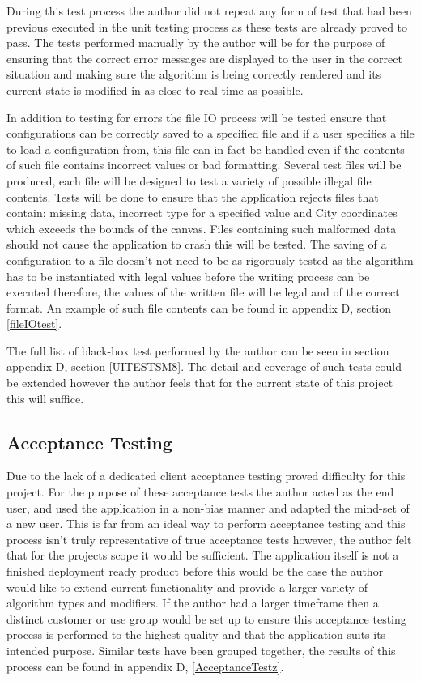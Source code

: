 During this test process the author did not repeat any form of test that had been previous executed in the unit testing process as these tests are already proved to pass. The tests performed manually by the author will be for the purpose of ensuring that the correct error messages are displayed to the user in the correct situation and making sure the algorithm is being correctly rendered and its current state is modified in as close to real time as possible. 

In addition to testing for errors the file IO process will be tested ensure that configurations can be correctly saved to a specified file and if a user specifies a file to load a configuration from, this file can in fact be handled even if the contents of such file contains incorrect values or bad formatting. Several test files will be produced, each file will be designed to test a variety of possible illegal file contents. Tests will be done to ensure that the application rejects files that contain; missing data, incorrect type for a specified value and City coordinates which exceeds the bounds of the canvas. Files containing such malformed data should not cause the application to crash this will be tested. The saving of a configuration to a file doesn’t not need to be as rigorously tested as the algorithm has to be instantiated with legal values before the writing process can be executed therefore, the values of the written file will be legal and of the correct format. An example of such file contents can be found in appendix D, section \ref{fileIOtest}.

The full list of black-box test performed by the author can be seen in section appendix D, section \ref{UITESTSM8}. The detail and coverage of such tests could be extended however the author feels that for the current state of this project this will suffice.

\subsection{Acceptance Testing}

Due to the lack of a dedicated client acceptance testing proved difficulty for this project. For the purpose of these acceptance tests the author acted as the end user, and used the application in a non-bias manner and adapted the mind-set of a new user. This is far from an ideal way to perform acceptance testing and this process isn’t truly representative of true acceptance tests however, the author felt that for the projects scope it would be sufficient. The application itself is not a finished deployment ready product before this would be the case the author would like to extend current functionality and provide a larger variety of algorithm types and modifiers. If the author had a larger timeframe then a distinct customer or use group would be set up to ensure this acceptance testing process is performed to the highest quality and that the application suits its intended purpose. Similar tests have been grouped together, the results of this process can be found in appendix D, \ref{AcceptanceTestz}.
